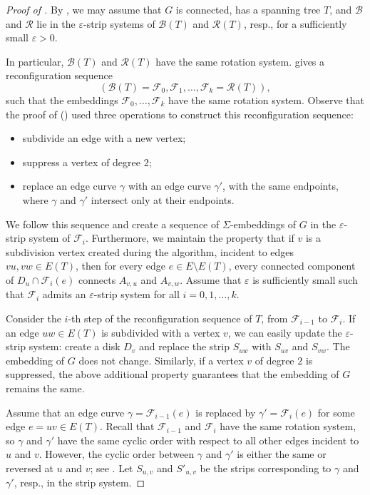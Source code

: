\documentclass[a4paper,USenglish,cleveref,colorlinks=true,urlcolor=black,linkcolor=black,citecolor=black,thm-restate,authorcolumns]{lipics-v2021}
\theoremstyle{claimstyle}
\begin{document}
\begin{proof}[Proof of ]
    By , we may assume that $G$ is connected, has a spanning tree $T$, and $\mathcal{B}$ and $\mathcal{R}$ lie in the $\varepsilon$-strip systems of $\mathcal{B}(T)$ and $\mathcal{R}(T)$, resp., for a sufficiently small $\varepsilon>0$.

    In particular, $\mathcal{B}(T)$ and $\mathcal{R}(T)$ have the same rotation system.  gives a reconfiguration sequence
    \[
        (\mathcal{B}(T)=\mathcal{F}_0,\mathcal{F}_1,\ldots , \mathcal{F}_k=\mathcal{R}(T)),
    \]
    such that the embeddings $\mathcal{F}_0,\ldots , \mathcal{F}_k$ have the same rotation system. Observe that the proof of  () used three operations to construct this reconfiguration sequence:
    \begin{itemize}
        \item subdivide an edge with a new vertex;
        \item suppress a vertex of degree 2;
        \item replace an edge curve $\gamma$ with an edge curve $\gamma'$, with the same endpoints, where $\gamma$ and $\gamma'$ intersect only at their endpoints.
    \end{itemize}
    We follow this sequence and create a sequence of $\Sigma$-embeddings of $G$ in the $\varepsilon$-strip system of $\mathcal{F}_i$.
    Furthermore, we maintain the property that if $v$ is a subdivision vertex created during the algorithm, incident to edges $vu,vw\in E(T)$,
    then for every edge $e\in E\setminus E(T)$, every connected component of $D_u\cap \mathcal{F}_i(e)$ connects $A_{v,u}$ and $A_{v,w}$.
    Assume that $\varepsilon$ is sufficiently small such that $\mathcal{F}_i$ admits an $\varepsilon$-strip system for all $i=0,1,\ldots ,k$.

    Consider the $i$-th step of the reconfiguration sequence of $T$, from $\mathcal{F}_{i-1}$ to $\mathcal{F}_i$.
    If an edge $uw\in E(T)$ is subdivided
    with a vertex $v$, we can easily update the $\varepsilon$-strip system: create a disk $D_v$ and replace the strip $S_{uw}$ with $S_{uv}$ and $S_{vw}$.
    The embedding of $G$ does not change.
    Similarly, if a vertex $v$ of degree $2$ is suppressed, the above additional property guarantees that the embedding of $G$ remains the same.

    Assume that an edge curve $\gamma=\mathcal{F}_{i-1}(e)$ is replaced by $\gamma'=\mathcal{F}_i(e)$ for some edge $e=uv\in E(T)$.
    Recall that $\mathcal{F}_{i-1}$ and  $\mathcal{F}_i$ have the same rotation system, so $\gamma$ and $\gamma'$ have the same cyclic order with respect to all other edges incident to $u$ and $v$.
    However, the cyclic order between $\gamma$ and $\gamma'$ is either the same or reversed at $u$ and $v$; see .
    Let $S_{u,v}$ and $S'_{u,v}$ be the strips corresponding to $\gamma$ and $\gamma'$, resp., in the strip system.



\end{proof}
\end{document}
